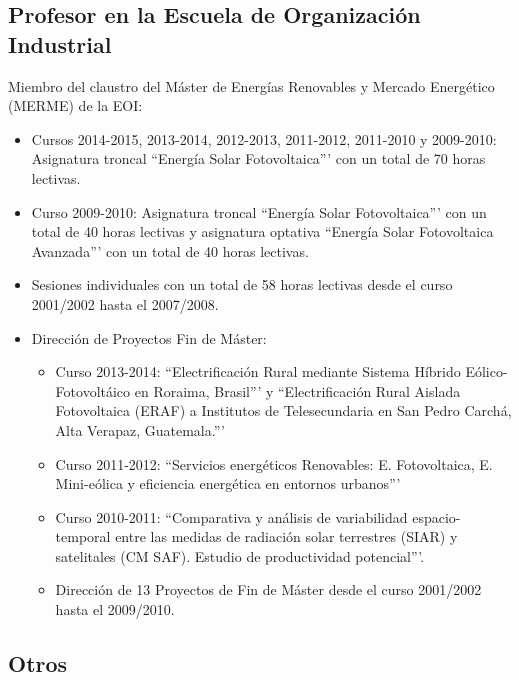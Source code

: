 \documentclass[article, a4paper]{memoir}
\begin{document}
\subsection{Profesor en la Escuela de Organización Industrial}
\label{sec-3-2}

Miembro del claustro del Máster de Energías Renovables y Mercado Energético (MERME) de la EOI:

\begin{itemize}
\item Cursos 2014-2015, 2013-2014, 2012-2013, 2011-2012, 2011-2010 y 2009-2010: Asignatura troncal ``Energía Solar Fotovoltaica''' con un total de 70 horas lectivas.

\item Curso 2009-2010: Asignatura troncal ``Energía Solar Fotovoltaica''' con un total de 40 horas lectivas y asignatura optativa ``Energía Solar Fotovoltaica Avanzada''' con un total de 40 horas lectivas.

\item Sesiones individuales con un total de 58 horas lectivas desde el curso 2001/2002 hasta el 2007/2008.

\item Dirección de Proyectos Fin de Máster:

\begin{itemize}
\item Curso 2013-2014: ``Electrificación Rural mediante Sistema Híbrido Eólico-Fotovoltáico en Roraima, Brasil''' y ``Electrificación Rural Aislada Fotovoltaica (ERAF) a Institutos de Telesecundaria en San Pedro Carchá, Alta Verapaz, Guatemala.'''
\item Curso 2011-2012: ``Servicios energéticos Renovables: E. Fotovoltaica, E. Mini-eólica y eficiencia energética en entornos urbanos'''
\item Curso 2010-2011: ``Comparativa y análisis de variabilidad espacio-temporal entre las medidas de radiación solar terrestres (SIAR) y satelitales (CM SAF). Estudio de productividad potencial'''.
\item Dirección de 13 Proyectos de Fin de Máster desde el curso 2001/2002 hasta el 2009/2010.
\end{itemize}
\end{itemize}


\subsection{Otros}
\label{sec-3-3}
\end{document}
